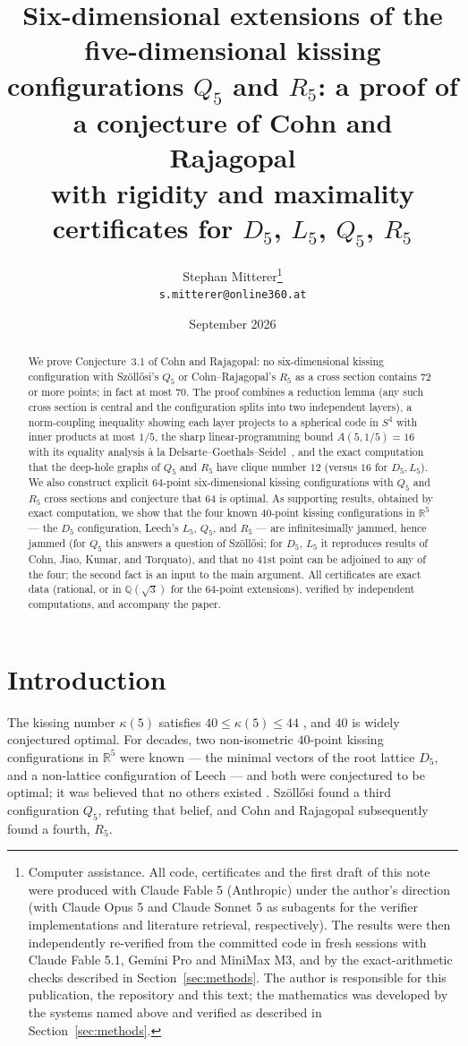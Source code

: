 \documentclass[11pt]{article}
\title{Six-dimensional extensions of the five-dimensional kissing\\
configurations $Q_5$ and $R_5$: a proof of a conjecture of Cohn and Rajagopal\\[0.6ex]
{\large with rigidity and maximality certificates for $D_5$, $L_5$, $Q_5$, $R_5$}}
\author{Stephan Mitterer\thanks{%
Computer assistance. All code, certificates and the first draft of this
note were produced with Claude Fable 5 (Anthropic) under the author's
direction (with Claude Opus 5 and Claude Sonnet 5 as subagents for the
verifier implementations and literature retrieval, respectively). The
results were then independently re-verified from the committed code in
fresh sessions with Claude Fable 5.1, Gemini Pro and MiniMax M3, and by
the exact-arithmetic checks described in Section~\ref{sec:methods}. The
author is responsible for this publication, the repository and this text;
the mathematics was developed by the systems named above and verified as
described in Section~\ref{sec:methods}.}\\
\texttt{s.mitterer@online360.at}}
\date{September 2026}
\theoremstyle{remark}
\newcommand{\R}{\mathbb{R}}
\newcommand{\Q}{\mathbb{Q}}
\begin{document}
\maketitle

\begin{abstract}
We prove Conjecture~3.1 of Cohn and Rajagopal: no six-dimensional
kissing configuration with Sz\"oll\H{o}si's $Q_5$ or Cohn--Rajagopal's
$R_5$ as a cross section contains $72$ or more points; in fact at most
$70$. The proof combines a reduction lemma (any such cross section is
central and the configuration splits into two independent layers), a
norm-coupling inequality showing each layer projects to a spherical code
in $S^4$ with inner products at most $1/5$, the sharp
linear-programming bound $A(5,1/5)=16$ with its equality analysis
\`a la Delsarte--Goethals--Seidel~\cite{DGS1977}, and the exact
computation that the deep-hole graphs of $Q_5$ and $R_5$ have clique
number $12$ (versus $16$ for $D_5,L_5$). We also construct explicit
$64$-point six-dimensional kissing configurations with $Q_5$ and $R_5$
cross sections and conjecture that $64$ is optimal.
As supporting results, obtained by exact computation, we show that the
four known $40$-point kissing configurations in $\R^5$ --- the $D_5$
configuration, Leech's $L_5$, $Q_5$, and $R_5$ --- are infinitesimally
jammed, hence jammed (for $Q_5$ this answers a question of
Sz\"oll\H{o}si; for $D_5$, $L_5$ it reproduces results of Cohn, Jiao,
Kumar, and Torquato), and that no $41$st point can be adjoined to any of
the four; the second fact is an input to the main argument.
All certificates are exact data (rational, or in $\Q(\sqrt3)$ for the
$64$-point extensions), verified by independent computations, and
accompany the paper.
\end{abstract}

\section{Introduction}

The kissing number $\kappa(5)$ satisfies $40\le\kappa(5)\le 44$
\cite{KZ1873,MV2010}, and $40$ is widely conjectured optimal. For
decades, two non-isometric $40$-point kissing configurations in $\R^5$
were known --- the minimal vectors of the root lattice $D_5$, and a
non-lattice configuration of Leech \cite{Leech1967} --- and both were
conjectured to be optimal; it was believed that no others existed
\cite{CS1995,CJKT2011}. Sz\"oll\H{o}si \cite{Sz2023} found a third
configuration $Q_5$, refuting that belief, and Cohn and Rajagopal
\cite{CR2024} subsequently found a fourth, $R_5$.
\end{document}
